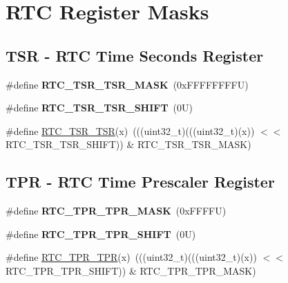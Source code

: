 \hypertarget{group___r_t_c___register___masks}{}\section{R\+TC Register Masks}
\label{group___r_t_c___register___masks}
\subsection*{T\+SR -\/ R\+TC Time Seconds Register}
\begin{DoxyCompactItemize}
\item 
\mbox{\label{group___r_t_c___register___masks_ga9a0f8842e8262ca176fcf028982153af}} 
\#define {\bfseries R\+T\+C\+\_\+\+T\+S\+R\+\_\+\+T\+S\+R\+\_\+\+M\+A\+SK}~(0x\+F\+F\+F\+F\+F\+F\+F\+F\+U)
\item 
\mbox{\label{group___r_t_c___register___masks_gad0476d1e39a866b5b5ba4728b55e258a}} 
\#define {\bfseries R\+T\+C\+\_\+\+T\+S\+R\+\_\+\+T\+S\+R\+\_\+\+S\+H\+I\+FT}~(0\+U)
\item 
\#define \mbox{\hyperlink{group___r_t_c___register___masks_ga0265b25e77883b6b0cb056ab697b5bc6}{R\+T\+C\+\_\+\+T\+S\+R\+\_\+\+T\+SR}}(x)~(((uint32\+\_\+t)(((uint32\+\_\+t)(x)) $<$$<$ R\+T\+C\+\_\+\+T\+S\+R\+\_\+\+T\+S\+R\+\_\+\+S\+H\+I\+FT)) \& R\+T\+C\+\_\+\+T\+S\+R\+\_\+\+T\+S\+R\+\_\+\+M\+A\+SK)
\end{DoxyCompactItemize}
\subsection*{T\+PR -\/ R\+TC Time Prescaler Register}
\begin{DoxyCompactItemize}
\item 
\mbox{\label{group___r_t_c___register___masks_ga2682f687fa561be2f002fc574d48cc79}} 
\#define {\bfseries R\+T\+C\+\_\+\+T\+P\+R\+\_\+\+T\+P\+R\+\_\+\+M\+A\+SK}~(0x\+F\+F\+F\+F\+U)
\item 
\mbox{\label{group___r_t_c___register___masks_ga624a290f73478b3ca2687ac49cc78fb2}} 
\#define {\bfseries R\+T\+C\+\_\+\+T\+P\+R\+\_\+\+T\+P\+R\+\_\+\+S\+H\+I\+FT}~(0\+U)
\item 
\#define \mbox{\hyperlink{group___r_t_c___register___masks_gac2c160abce9b85ad4d9386f0dd8c31ea}{R\+T\+C\+\_\+\+T\+P\+R\+\_\+\+T\+PR}}(x)~(((uint32\+\_\+t)(((uint32\+\_\+t)(x)) $<$$<$ R\+T\+C\+\_\+\+T\+P\+R\+\_\+\+T\+P\+R\+\_\+\+S\+H\+I\+FT)) \& R\+T\+C\+\_\+\+T\+P\+R\+\_\+\+T\+P\+R\+\_\+\+M\+A\+SK)
\end{DoxyCompactItemize}
